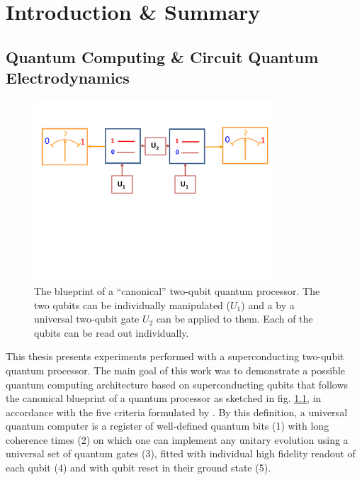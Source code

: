 \chapter{Introduction \& Summary}


\section{Quantum Computing \& Circuit Quantum Electrodynamics}

\begin{figure}
	\centering
		\includegraphics[width=0.8\textwidth]{./material/papers/grover/submission1/Fig1}
	\caption[Blueprint of a ``canonical'' two-qubit quantum processor]{The blueprint of a ``canonical'' two-qubit quantum processor. The two qubits   can be individually manipulated ($U_1$) and a    by a universal two-qubit gate $U_2$ can be applied to them. Each of the qubits can be read out individually.}
	\label{fig:qubit_processor_blueprint}
\end{figure}

This thesis presents experiments performed with a superconducting two-qubit quantum processor. The main goal of this work was to demonstrate a possible quantum computing architecture based on superconducting  qubits that follows the canonical blueprint of a quantum processor as sketched in fig. \ref{fig:qubit_processor_blueprint}, in accordance with the five criteria formulated by \cite{divincenzo_physical_2000}. By this definition, a universal quantum computer is a register of well-defined quantum bits (1) with long coherence times (2) on which one can implement any unitary evolution using a universal set of quantum  gates (3), fitted with  individual   high fidelity readout   of each qubit (4) and with qubit reset in their ground  state (5).

